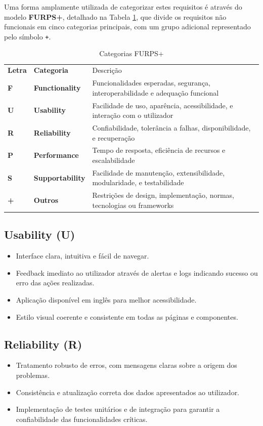 Uma forma amplamente utilizada de categorizar estes requisitos é através do modelo \textbf{FURPS+}, detalhado na Tabela \ref{tab:furps}, que divide os requisitos não funcionais em cinco categorias principais, com um grupo adicional representado pelo símbolo \texttt{+}.

\begin{table}[H]
    \renewcommand{\arraystretch}{1.2}
    \setlength{\tabcolsep}{10pt}
    \centering
    \begin{tabular}{>{\bfseries}p{1cm} >{\bfseries}p{2.5cm} p{10cm}}
        \rowcolor{blue!50}
        Letra & Categoria & Descrição \\
        F & Functionality & Funcionalidades esperadas, segurança, interoperabilidade e adequação funcional \\
        U & Usability & Facilidade de uso, aparência, acessibilidade, e interação com o utilizador \\
        R & Reliability & Confiabilidade, tolerância a falhas, disponibilidade, e recuperação \\
        P & Performance & Tempo de resposta, eficiência de recursos e escalabilidade \\
        S & Supportability & Facilidade de manutenção, extensibilidade, modularidade, e testabilidade \\
        + & Outros & Restrições de design, implementação, normas, tecnologias ou frameworks \\
    \end{tabular}
    \caption{Categorias FURPS+}
    \label{tab:furps}
\end{table}

\subsection{Usability (U)}
\begin{itemize}
    \item Interface clara, intuitiva e fácil de navegar.
    \item Feedback imediato ao utilizador através de alertas e logs indicando sucesso ou erro das ações realizadas.
    \item Aplicação disponível em inglês para melhor acessibilidade.
    \item Estilo visual coerente e consistente em todas as páginas e componentes.
\end{itemize}

\subsection{Reliability (R)}
\begin{itemize}
    \item Tratamento robusto de erros, com mensagens claras sobre a origem dos problemas.
    \item Consistência e atualização correta dos dados apresentados ao utilizador.
    \item Implementação de testes unitários e de integração para garantir a confiabilidade das funcionalidades críticas.
\end{itemize}

